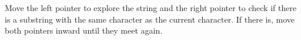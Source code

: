 \documentclass[preview]{standalone}
\begin{document}
Move the left pointer to explore the string and the right pointer to check if there is a substring with the same character as the current character. If there is, move both pointers inward until they meet again.\\
\end{document}
